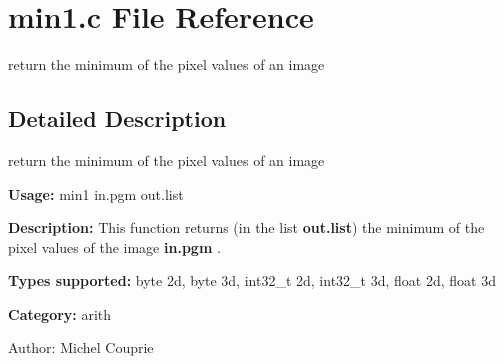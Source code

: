\section{min1.c File Reference}
\label{min1_8c}
return the minimum of the pixel values of an image 



\subsection{Detailed Description}
return the minimum of the pixel values of an image 

{\bf Usage:} min1 in.pgm out.list

{\bf Description:} This function returns (in the list {\bf out.list}) the minimum of the pixel values of the image {\bf in.pgm} .

{\bf Types supported:} byte 2d, byte 3d, int32\_\-t 2d, int32\_\-t 3d, float 2d, float 3d

{\bf Category:} arith

\begin{Desc}
\item[Author:]Michel Couprie \end{Desc}
